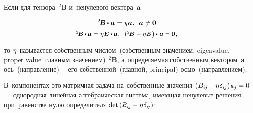 \begin{otherlanguage}{russian}

Если для тензора~${^2\!\bm{B}}$ и~ненулевого вектора~${\bm{a}}$

\nopagebreak\vspace{-0.2em}\begin{equation}\label{eigenvalues:eq}
^2\!\bm{B} \dotp \bm{a} = \eigenvalue \bm{a} \hspace{.1ex} ,
\:\:
\bm{a} \neq \bm{0}
\end{equation}
\vspace{-1.2em}\[
\scalebox{0.92}[0.92]{${^2\!\bm{B}} \dotp \bm{a} = \eigenvalue \bm{E} \dotp \bm{a} \hspace{0.1ex},\;\;
\left(\hspace{0.1ex}
{^2\!\bm{B} - \eigenvalue \bm{E}}
\hspace{0.2ex}\right) \hspace{-0.1ex} \dotp \hspace{.1ex} \bm{a} = \bm{0}$} \hspace{.1ex},
\]

\vspace{-0.64em} \noindent то $\eta\hspace{.1ex}$ называется собственным числом~(собственным значением, eigenvalue, proper value, главным значением)~${^2\!\bm{B}}$, а~определяемая собственным вектором~$\bm{a}$ ось~(направление)\:--- его собственной~(главной, principal) осью~(направлением).

В~компонентах это матричная задача на~собственные значения ${( B_{i\hspace{-0.1ex}j} \hspace{-0.12ex} - \eta\hspace{.1ex} \delta_{i\hspace{-0.1ex}j} ) \hspace{.25ex} a_j \hspace{-0.1ex} = 0}$\:--- однородная линейная алгебраическая система, имеющая ненулевые решения при~равенстве нулю определителя ${\operatorname{det}\hspace{.32ex} ( B_{i\hspace{-0.1ex}j} \hspace{-0.12ex} - \eta\hspace{.1ex} \delta_{i\hspace{-0.1ex}j} )}$:


\end{otherlanguage}
